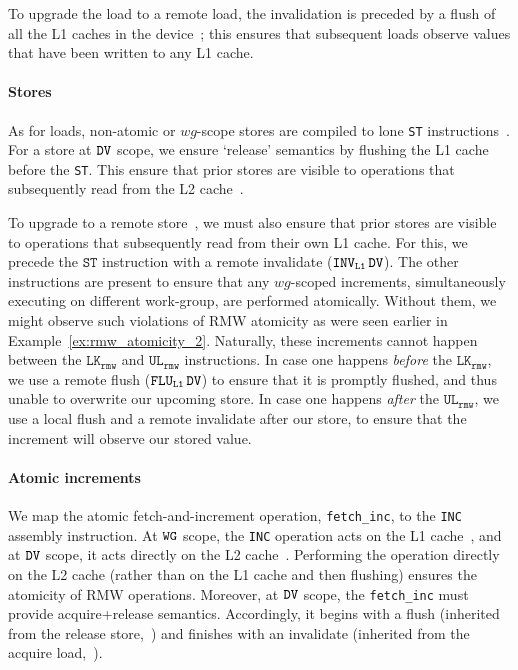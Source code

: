\documentclass[svgnames,10pt]{sigplanconf}
\theoremstyle{definition}
\newcommand\var[1]{\mathit{#1}}
\newcommand\swg{{\tt WG}}
\newcommand\sdv{{\tt DV}}
\newcommand\wg{\var{wg}}
\newcommand\INSst{\texttt{ST}}
\newcommand\INSflushl[1]{\texttt{FLU$_{\texttt{L#1}}$}}
\newcommand\INSinvall[1]{\texttt{INV$_{\texttt{L#1}}$}}
\newcommand\INSlk[1]{\texttt{LK$_{\texttt{#1}}$}}
\newcommand\INSul[1]{\texttt{UL$_{\texttt{#1}}$}}
\begin{document}
To upgrade the load to a remote load, the invalidation is preceded by
a flush of all the L1 caches in the device~; this ensures
that subsequent loads observe values that have been written to any L1
cache.

\paragraph{Stores}
As for loads, non-atomic or $\wg$-scope stores
are compiled to lone \INSst{} instructions~. For a store at
$\sdv$ scope, we ensure `release' semantics by flushing the L1 cache before the \INSst{}. This
ensure that prior stores are visible to operations that subsequently
read from the L2 cache~. 

To upgrade to a remote store~, we must also ensure that
prior stores are visible to operations that subsequently read from
their own L1 cache. For this, we precede the $\INSst$ instruction with
a remote invalidate ($\INSinvall1\,\sdv$). The other instructions are
present to ensure that any $\wg$-scoped increments, simultaneously
executing on different work-group, are performed atomically. Without
them, we might observe such violations of RMW atomicity as were seen
earlier in Example~\ref{ex:rmw_atomicity_2}. Naturally, these
increments cannot happen between the $\INSlk{rmw}$ and $\INSul{rmw}$
instructions. In case one happens \emph{before} the $\INSlk{rmw}$, we
use a remote flush ($\INSflushl1\,\sdv$) to ensure that it is promptly
flushed, and thus unable to overwrite our upcoming store. In case one
happens \emph{after} the $\INSul{rmw}$, we use a local flush and a
remote invalidate after our store, to ensure that the increment will
observe our stored value.

\paragraph{Atomic increments}
We map the atomic fetch-and-increment operation, \texttt{fetch\_inc},
to the \texttt{INC} assembly instruction. At $\swg$ scope, the \texttt{INC} operation acts on the L1
cache~, and at $\sdv$ scope, it acts directly on the L2
cache~. Performing the operation directly on the L2 cache
(rather than on the L1 cache and then flushing) ensures the atomicity
of RMW operations. Moreover, at $\sdv$ scope, the \texttt{fetch\_inc}
must provide acquire+release semantics. Accordingly, it begins with a
flush (inherited from the release store,~) and finishes with
an invalidate (inherited from the acquire load,~).
\end{document}
